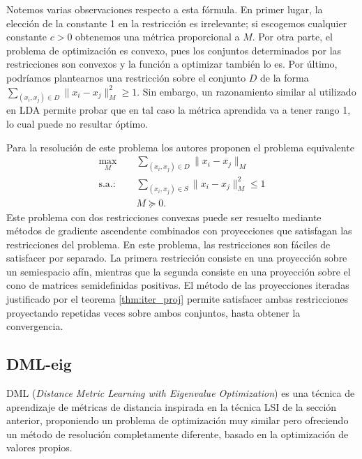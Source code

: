 Notemos varias observaciones respecto a esta fórmula. En primer lugar, la elección de la constante 1 en la restricción es irrelevante; si escogemos cualquier constante $c > 0$ obtenemos una métrica proporcional a $M$. Por otra parte, el problema de optimización es convexo, pues los conjuntos determinados por las restricciones son convexos y la función a optimizar también lo es. Por último, podríamos plantearnos una restricción sobre el conjunto $D$ de la forma $\sum_{(x_i,x_j) \in D} \|x_i - x_j\|_M^2 \ge 1$. Sin embargo, un razonamiento similar al utilizado en LDA permite probar que en tal caso la métrica aprendida va a tener rango 1, lo cual puede no resultar óptimo.

Para la resolución de este problema los autores proponen el problema equivalente
\begin{equation} \label{eq:lsi:equiv}
\begin{split}
    \max_{M} &\quad \sum_{(x_i,x_j)\in D}  \|x_i - x_j \|_M \\
    \text{s.a.: } &\quad \sum_{(x_i,x_j) \in S} \|x_i - x_j\|_M^2 \le 1 \\
                  &\quad M \succeq 0.
\end{split}
\end{equation}
Este problema con dos restricciones convexas puede ser resuelto mediante métodos de gradiente ascendente combinados con proyecciones que satisfagan las restricciones del problema. En este problema, las restricciones son fáciles de satisfacer por separado. La primera restricción consiste en una proyección sobre un semiespacio afín, mientras que la segunda consiste en una proyección sobre el cono de matrices semidefinidas positivas. El método de las proyecciones iteradas justificado por el teorema \ref{thm:iter_proj} permite satisfacer ambas restricciones proyectando repetidas veces sobre ambos conjuntos, hasta obtener la convergencia.

\subsection{DML-eig}

DML (\emph{Distance Metric Learning with Eigenvalue Optimization}) \cite{dmleig} es una técnica de aprendizaje de métricas de distancia inspirada en la técnica LSI de la sección anterior, proponiendo un problema de optimización muy similar pero ofreciendo un método de resolución completamente diferente, basado en la optimización de valores propios.

